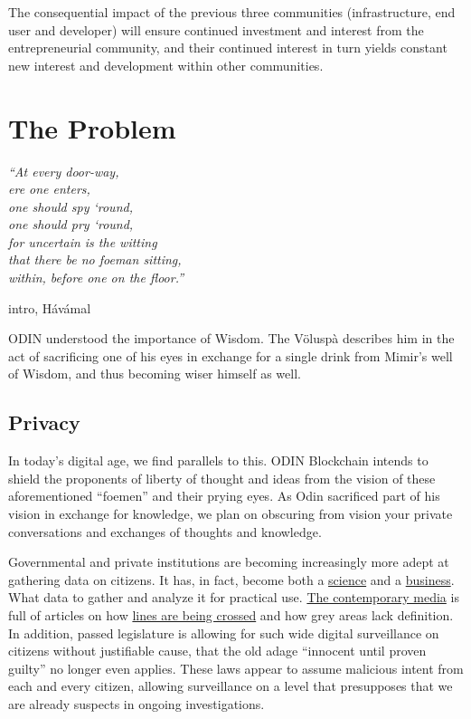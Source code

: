 \documentclass[12pt,letterpaper]{article}
\begin{document}
The consequential impact of the previous three communities (infrastructure, end user and developer) will ensure continued investment and interest from the entrepreneurial community, and their continued interest in turn yields constant new interest and development within other communities.

\newpage
\section{​The Problem}
\epigraph{\itshape
``At every door-way,\\
ere one enters, \\
one should spy ‘round,\\
one should pry ‘round,\\
for uncertain is the witting\\
that there be no foeman sitting,\\
within, before one on the floor.''}{intro, H\'av\'amal}

ODIN understood the importance of Wisdom. The V\"olusp\`a describes him in the act of  sacrificing one of his eyes in exchange for a single drink from Mimir's well of Wisdom, and thus becoming wiser himself as well.

\subsection{Privacy}
In today's digital age, we find parallels to this. ODIN Blockchain intends to shield the proponents of liberty of thought and ideas from the vision of these aforementioned ``foemen'' and their prying eyes. As Odin sacrificed part of his vision in exchange for knowledge, we plan on obscuring from vision your private conversations and exchanges of thoughts and knowledge. 

Governmental and private institutions are becoming increasingly more adept at gathering data on citizens. It has, in fact, become both a \href{https://patents.google.com/patent/US20110087529A1/en}{science} and a \href{https://patents.google.com/patent/US5974396A/en}{business}. What data to gather and analyze it for practical use. \href{https://www.theguardian.com/news/series/cambridge-analytica-files}{The contemporary media} is full of articles on how \href{https://wikileaks.org/}{lines are being crossed} and how grey areas lack definition.  In addition, passed legislature is allowing for such wide digital surveillance on citizens without justifiable cause, that the old adage ``innocent until proven guilty'' no longer even applies. These laws appear to assume malicious intent from each and every citizen, allowing surveillance on a level that presupposes that we are already suspects in ongoing investigations.
\end{document}
